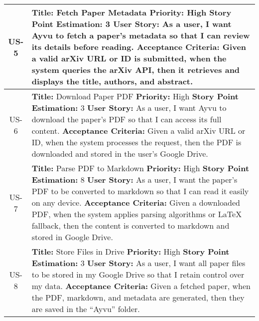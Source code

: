 \documentclass[12pt]{article}
\begin{document}
\begin{longtable}{|c|p{15cm}|}
  \hline
  US-5 &
  \textbf{Title:} Fetch Paper Metadata \newline
  \textbf{Priority:} High \newline
  \textbf{Story Point Estimation:} 3 \newline
  \textbf{User Story:} As a user, I want Ayvu to fetch a paper's metadata so that I can review its details before reading. \newline
  \textbf{Acceptance Criteria:} Given a valid arXiv URL or ID is submitted, when the system queries the arXiv API, then it retrieves and displays the title, authors, and abstract. \\

  \hline
  US-6 &
  \textbf{Title:} Download Paper PDF \newline
  \textbf{Priority:} High \newline
  \textbf{Story Point Estimation:} 3 \newline
  \textbf{User Story:} As a user, I want Ayvu to download the paper's PDF so that I can access its full content. \newline
  \textbf{Acceptance Criteria:} Given a valid arXiv URL or ID, when the system processes the request, then the PDF is downloaded and stored in the user's Google Drive. \\

  \hline
  US-7 &
  \textbf{Title:} Parse PDF to Markdown \newline
  \textbf{Priority:} High \newline
  \textbf{Story Point Estimation:} 8 \newline
  \textbf{User Story:} As a user, I want the paper's PDF to be converted to markdown so that I can read it easily on any device. \newline
  \textbf{Acceptance Criteria:} Given a downloaded PDF, when the system applies parsing algorithms or LaTeX fallback, then the content is converted to markdown and stored in Google Drive. \\

  \hline
  US-8 &
  \textbf{Title:} Store Files in Drive \newline
  \textbf{Priority:} High \newline
  \textbf{Story Point Estimation:} 3 \newline
  \textbf{User Story:} As a user, I want all paper files to be stored in my Google Drive so that I retain control over my data. \newline
  \textbf{Acceptance Criteria:} Given a fetched paper, when the PDF, markdown, and metadata are generated, then they are saved in the ``Ayvu'' folder. \\


\end{longtable}
\end{document}
